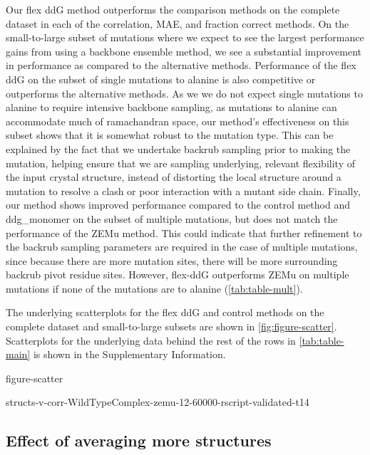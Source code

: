 Our flex ddG method outperforms the comparison methods on the complete dataset in each of the correlation, MAE, and fraction correct methods. On the small-to-large subset of mutations where we expect to see the largest performance gains from using a backbone ensemble method, we see a substantial improvement in performance as compared to the alternative methods.
Performance of the flex ddG on the subset of single mutations to alanine is also competitive or outperforms the alternative methods.
As we we do not expect single mutations to alanine to require intensive backbone sampling, as mutations to alanine can accommodate much of ramachandran space\cite{cunningham_high-resolution_1989}, our method's effectiveness on this subset shows that it is somewhat robust to the mutation type.
This can be explained by the fact that we undertake backrub sampling prior to making the mutation, helping ensure that we are sampling underlying, relevant flexibility of the input crystal structure, instead of distorting the local structure around a mutation to resolve a clash or poor interaction with a mutant side chain.
Finally, our method shows improved performance compared to the control method and ddg\_monomer on the subset of multiple mutations, but does not match the performance of the ZEMu method.
This could indicate that further refinement to the backrub sampling parameters are required in the case of multiple mutations, since because there are more mutation sites, there will be more surrounding backrub pivot residue sites.
However, flex-ddG outperforms ZEMu on multiple mutations if none of the mutations are to alanine (\cref{tab:table-mult}).

The underlying scatterplots for the flex ddG and control methods on the complete dataset and small-to-large subsets are shown in \cref{fig:figure-scatter}. Scatterplots for the underlying data behind the rest of the rows in \cref{tab:table-main} is shown in the Supplementary Information.

{figure-scatter}

{structs-v-corr-WildTypeComplex-zemu-12-60000-rscript-validated-t14}

\subsection{Effect of averaging more structures}


